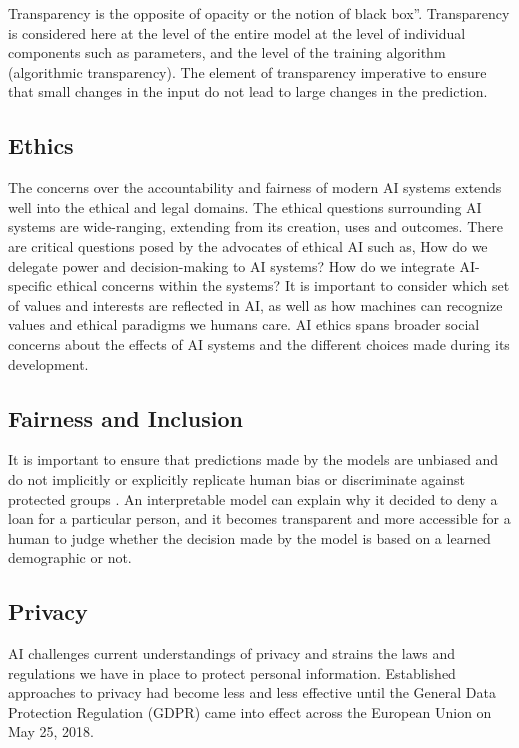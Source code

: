 Transparency is the opposite of opacity or the notion of black box”. Transparency is considered here at the level of the entire model at the level of individual components such as parameters, and the level of the training algorithm (algorithmic transparency). The element of transparency imperative to ensure that small changes in the input do not lead to large changes in the prediction.

\subsection{Ethics}

The concerns over the accountability and fairness of modern AI systems extends well into the ethical and legal domains. The ethical questions surrounding AI systems are wide-ranging, extending from its creation, uses and outcomes. There are critical questions posed by the advocates of ethical AI such as, How do we delegate power and decision-making to AI systems? How do we integrate AI-specific ethical concerns within the systems? It is important to consider which set of values and interests are reflected in AI, as well as how machines can recognize values and ethical paradigms we humans care. AI ethics spans broader social concerns about the effects of AI systems and the different choices made during its development.

\subsection{Fairness and Inclusion}

It is important to ensure that predictions made by the models are unbiased and do not implicitly or explicitly replicate human bias or discriminate against protected groups \cite{ainow2016report}. An interpretable model can explain why it decided to deny a loan for a particular person, and it becomes transparent and more accessible for a human to judge whether the decision made by the model is based on a learned demographic or not.

\subsection{Privacy}

AI challenges current understandings of privacy and strains the laws and regulations we have in place to protect personal information. Established approaches to privacy had become less and less effective until the General Data Protection Regulation (GDPR) came into effect across the European Union on May 25, 2018.

